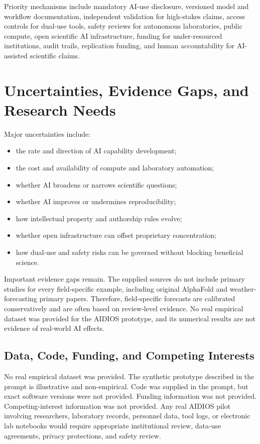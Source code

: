 \documentclass[12pt]{article}
\begin{document}
Priority mechanisms include mandatory AI-use disclosure, versioned model and workflow documentation, independent validation for high-stakes claims, access controls for dual-use tools, safety reviews for autonomous laboratories, public compute, open scientific AI infrastructure, funding for under-resourced institutions, audit trails, replication funding, and human accountability for AI-assisted scientific claims.

\section{Uncertainties, Evidence Gaps, and Research Needs}

Major uncertainties include:
\begin{itemize}[leftmargin=*]
    \item the rate and direction of AI capability development;
    \item the cost and availability of compute and laboratory automation;
    \item whether AI broadens or narrows scientific questions;
    \item whether AI improves or undermines reproducibility;
    \item how intellectual property and authorship rules evolve;
    \item whether open infrastructure can offset proprietary concentration;
    \item how dual-use and safety risks can be governed without blocking beneficial science.
\end{itemize}

Important evidence gaps remain. The supplied sources do not include primary studies for every field-specific example, including original AlphaFold and weather-forecasting primary papers. Therefore, field-specific forecasts are calibrated conservatively and are often based on review-level evidence. No real empirical dataset was provided for the AIDIOS prototype, and its numerical results are not evidence of real-world AI effects.

\subsection*{Data, Code, Funding, and Competing Interests}

No real empirical dataset was provided. The synthetic prototype described in the prompt is illustrative and non-empirical. Code was supplied in the prompt, but exact software versions were not provided. Funding information was not provided. Competing-interest information was not provided. Any real AIDIOS pilot involving researchers, laboratory records, personnel data, tool logs, or electronic lab notebooks would require appropriate institutional review, data-use agreements, privacy protections, and safety review.
\end{document}
